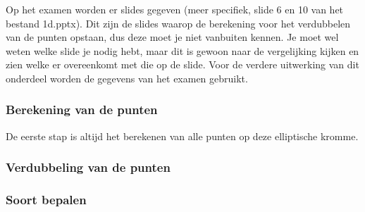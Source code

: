 Op het examen worden er slides gegeven (meer specifiek, slide 6 en 10 van het bestand 1d.pptx). Dit zijn de slides waarop de berekening voor het verdubbelen van de punten opstaan, dus deze moet je niet  vanbuiten kennen. Je moet wel weten welke slide je nodig hebt, maar dit is gewoon naar de vergelijking kijken en zien welke er overeenkomt met die op de slide. Voor de verdere uitwerking van dit onderdeel worden de gegevens van het examen gebruikt.



\subsubsection{Berekening van de punten}
De eerste stap is altijd het berekenen van alle punten op deze elliptische kromme. 

\subsubsection{Verdubbeling van de punten}

\subsubsection{Soort bepalen}
